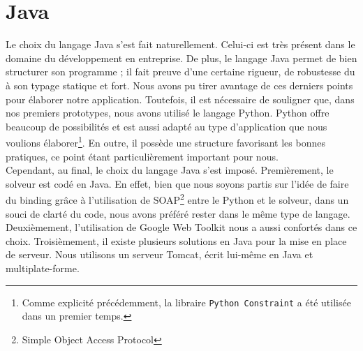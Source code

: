 \section{Java}
Le choix du langage Java s'est fait naturellement. Celui-ci est très présent
dans le domaine du développement en entreprise. De plus, le langage Java permet de bien
structurer son programme ; il fait preuve d'une certaine rigueur, de robustesse du à son typage statique et fort. Nous avons pu
tirer avantage de ces derniers points pour élaborer notre application.
\newline
\indent
Toutefois, il est nécessaire de souligner que, dans nos premiers prototypes, nous avons utilisé le langage Python. Python offre beaucoup de possibilités et est aussi adapté
au type d'application que nous voulions élaborer\footnote{Comme explicité précédemment, la libraire \texttt{Python Constraint} a été utilisée dans un premier temps.}. En outre, il possède une structure
favorisant les bonnes pratiques, ce point étant particulièrement important pour
nous.\\
\newline
\indent
Cependant, au final, le choix du langage Java s'est imposé. Premièrement, le solveur est codé en Java. En effet, bien que nous soyons partis sur l'idée de faire du binding grâce à l'utilisation de SOAP\footnote{Simple Object Access Protocol} entre le Python et le solveur, dans un souci de clarté du code, nous avons préféré rester dans le même type de langage.
Deuxièmement, l'utilisation de Google Web Toolkit nous a aussi confortés dans ce choix.
Troisièmement, il existe plusieurs solutions en Java pour la mise en place de serveur. Nous utilisons un serveur Tomcat, écrit lui-même en Java et multiplate-forme. 






